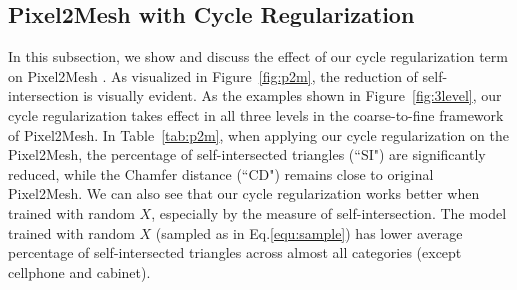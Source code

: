 \subsection{Pixel2Mesh with Cycle Regularization}
In this subsection, we show and discuss the effect of our cycle regularization term on Pixel2Mesh \cite{pixel2mesh}. As visualized in Figure~\ref{fig:p2m}, the reduction of self-intersection is visually evident. As the examples shown in Figure~\ref{fig:3level}, our cycle regularization takes effect in all three levels in the coarse-to-fine framework of Pixel2Mesh. In Table~\ref{tab:p2m}, when applying our cycle regularization on the Pixel2Mesh, the percentage of self-intersected triangles (``SI") are significantly reduced, while the Chamfer distance (``CD") remains close to original Pixel2Mesh. We can also see that our cycle regularization works better when trained with random $X$, especially by the measure of self-intersection. The model trained with random $X$ (sampled as in Eq.\ref{equ:sample}) has lower average percentage of self-intersected triangles across almost all categories (except cellphone and cabinet).
